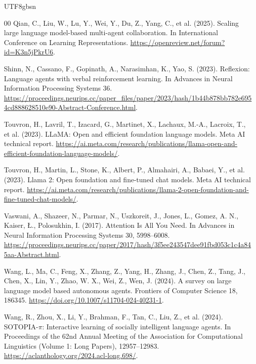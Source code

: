 \documentclass[a4paper,fleqn]{cas-sc}
\begin{document}
\begin{CJK*}{UTF8}{gbsn}
\begin{thebibliography}{00}
Qian, C., Liu, W., Lu, Y., Wei, Y., Du, Z., Yang, C., et al. (2025). Scaling large language model-based multi-agent collaboration. In International Conference on Learning Representations. \url{https://openreview.net/forum?id=K3n5jPkrU6}.

Shinn, N., Cassano, F., Gopinath, A., Narasimhan, K., Yao, S. (2023). Reflexion: Language agents with verbal reinforcement learning. In Advances in Neural Information Processing Systems 36. \url{https://proceedings.neurips.cc/paper_files/paper/2023/hash/1b44b878bb782e6954cd888628510e90-Abstract-Conference.html}.

Touvron, H., Lavril, T., Izacard, G., Martinet, X., Lachaux, M.-A., Lacroix, T., et al. (2023). LLaMA: Open and efficient foundation language models. Meta AI technical report. \url{https://ai.meta.com/research/publications/llama-open-and-efficient-foundation-language-models/}.

Touvron, H., Martin, L., Stone, K., Albert, P., Almahairi, A., Babaei, Y., et al. (2023). Llama 2: Open foundation and fine-tuned chat models. Meta AI technical report. \url{https://ai.meta.com/research/publications/llama-2-open-foundation-and-fine-tuned-chat-models/}.

Vaswani, A., Shazeer, N., Parmar, N., Uszkoreit, J., Jones, L., Gomez, A. N., Kaiser, {\L}., Polosukhin, I. (2017). Attention Is All You Need. In Advances in Neural Information Processing Systems 30, 5998--6008. \url{https://proceedings.neurips.cc/paper/2017/hash/3f5ee243547dee91fbd053c1c4a845aa-Abstract.html}.

Wang, L., Ma, C., Feng, X., Zhang, Z., Yang, H., Zhang, J., Chen, Z., Tang, J., Chen, X., Lin, Y., Zhao, W. X., Wei, Z., Wen, J. (2024). A survey on large language model based autonomous agents. Frontiers of Computer Science 18, 186345. \url{https://doi.org/10.1007/s11704-024-40231-1}.

Wang, R., Zhou, X., Li, Y., Brahman, F., Tan, C., Liu, Z., et al. (2024). SOTOPIA-$\pi$: Interactive learning of socially intelligent language agents. In Proceedings of the 62nd Annual Meeting of the Association for Computational Linguistics (Volume 1: Long Papers), 12957--12983. \url{https://aclanthology.org/2024.acl-long.698/}.


\end{thebibliography}
\end{CJK*}
\end{document}
